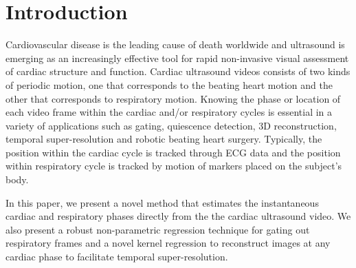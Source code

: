 \documentclass[runningheads,a4paper]{llncs}
\begin{document}
\section{Introduction}
\label{sec:intro}
%
Cardiovascular disease is the leading cause of death worldwide and ultrasound is emerging as an increasingly effective tool for rapid non-invasive visual assessment of cardiac structure and function. Cardiac ultrasound videos consists of two kinds of periodic motion, one that corresponds to the beating heart motion and the other that corresponds to respiratory motion. Knowing the phase or location of each video frame within the cardiac and/or respiratory cycles is essential in a variety of applications such as gating\cite{VonBirgelen1997}, quiescence detection\cite{Wick2013}, 3D reconstruction\cite{Wachinger2012}, temporal super-resolution\cite{Cherin2006} and robotic beating heart surgery\cite{Kurz2015}. Typically, the position within the cardiac cycle is tracked through ECG data and the position within respiratory cycle is tracked by motion of markers placed on the subject's body\cite{Khamene2004}. 

	In this paper, we present a novel method that estimates the instantaneous cardiac and respiratory phases directly from the the cardiac ultrasound video. We also present a robust non-parametric regression technique for gating out respiratory frames and a novel kernel regression to reconstruct images at any cardiac phase to facilitate temporal super-resolution.	
%
\vspace{-0.5cm}
\end{document}
